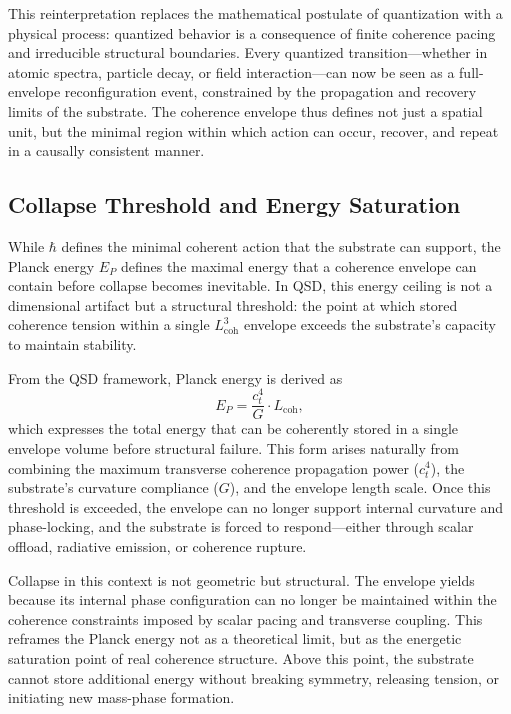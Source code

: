 \documentclass[entropy,article,submit,pdftex,oneauthor]{Definitions/mdpi}
\begin{document}
This reinterpretation replaces the mathematical postulate of quantization with a physical process: quantized behavior is a consequence of finite coherence pacing and irreducible structural boundaries. Every quantized transition—whether in atomic spectra, particle decay, or field interaction—can now be seen as a full-envelope reconfiguration event, constrained by the propagation and recovery limits of the substrate. The coherence envelope thus defines not just a spatial unit, but the minimal region within which action can occur, recover, and repeat in a causally consistent manner.
\subsection{Collapse Threshold and Energy Saturation}

While \texorpdfstring{\( \hbar \)}{hbar} defines the minimal coherent action that the substrate can support, the Planck energy \texorpdfstring{\( E_P \)}{Ep} defines the maximal energy that a coherence envelope can contain before collapse becomes inevitable. In QSD, this energy ceiling is not a dimensional artifact but a structural threshold: the point at which stored coherence tension within a single \texorpdfstring{\( L_{\text{coh}}^3 \)}{Lcoh\^{}3} envelope exceeds the substrate’s capacity to maintain stability.

From the QSD framework, Planck energy is derived as
\[
E_P = \frac{c_t^4}{G} \cdot L_{\text{coh}},
\]
which expresses the total energy that can be coherently stored in a single envelope volume before structural failure. This form arises naturally from combining the maximum transverse coherence propagation power (\texorpdfstring{\( c_t^4 \)}{ct\^{}4}), the substrate’s curvature compliance (\texorpdfstring{\( G \)}{G}), and the envelope length scale. Once this threshold is exceeded, the envelope can no longer support internal curvature and phase-locking, and the substrate is forced to respond—either through scalar offload, radiative emission, or coherence rupture.

Collapse in this context is not geometric but structural. The envelope yields because its internal phase configuration can no longer be maintained within the coherence constraints imposed by scalar pacing and transverse coupling. This reframes the Planck energy not as a theoretical limit, but as the energetic saturation point of real coherence structure. Above this point, the substrate cannot store additional energy without breaking symmetry, releasing tension, or initiating new mass-phase formation.
\end{document}
